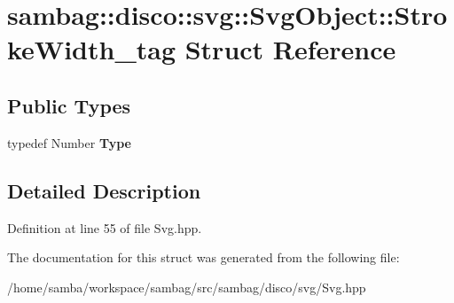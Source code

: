 \hypertarget{structsambag_1_1disco_1_1svg_1_1_svg_object_1_1_stroke_width__tag}{
\section{sambag::disco::svg::SvgObject::StrokeWidth\_\-tag Struct Reference}
\label{structsambag_1_1disco_1_1svg_1_1_svg_object_1_1_stroke_width__tag}
}
\subsection*{Public Types}
\begin{DoxyCompactItemize}
\item 
\hypertarget{structsambag_1_1disco_1_1svg_1_1_svg_object_1_1_stroke_width__tag_ae1b3dd28a1387f8c50c05ae15ba01f3d}{
typedef Number {\bfseries Type}}
\label{structsambag_1_1disco_1_1svg_1_1_svg_object_1_1_stroke_width__tag_ae1b3dd28a1387f8c50c05ae15ba01f3d}

\end{DoxyCompactItemize}


\subsection{Detailed Description}


Definition at line 55 of file Svg.hpp.



The documentation for this struct was generated from the following file:\begin{DoxyCompactItemize}
\item 
/home/samba/workspace/sambag/src/sambag/disco/svg/Svg.hpp\end{DoxyCompactItemize}
